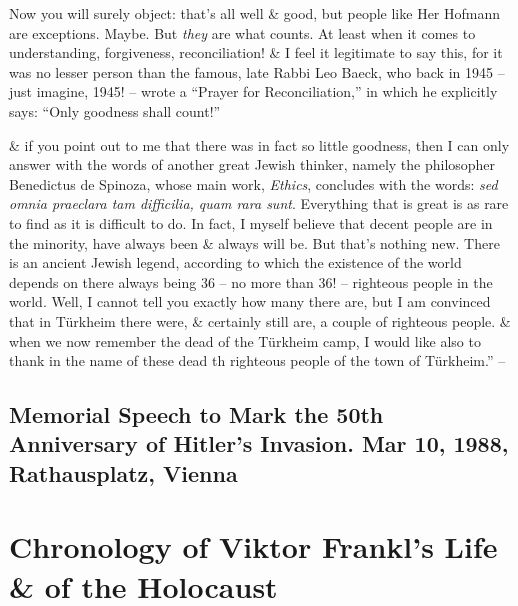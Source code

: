 \documentclass{article}
\numberwithin{equation}{section}
\begin{document}
Now you will surely object: that's all well \& good, but people like Her Hofmann are exceptions. Maybe. But \textit{they} are what counts. At least when it comes to understanding, forgiveness, reconciliation! \& I feel it legitimate to say this, for it was no lesser person than the famous, late Rabbi Leo Baeck, who back in 1945 -- just imagine, 1945! -- wrote a ``Prayer for Reconciliation,'' in which he explicitly says: ``Only goodness shall count!''

\& if you point out to me that there was in fact so little goodness, then I can only answer with the words of another great Jewish thinker, namely the philosopher Benedictus de Spinoza, whose main work, \textit{Ethics}, concludes with the words: \textit{sed omnia praeclara tam difficilia, quam rara sunt}. Everything that is great is as rare to find as it is difficult to do. In fact, I myself believe that decent people are in the minority, have always been \& always will be. But that's nothing new. There is an ancient Jewish legend, according to which the existence of the world depends on there always being 36 -- no more than 36! -- righteous people in the world. Well, I cannot tell you exactly how many there are, but I am convinced that in T\"urkheim there were, \& certainly still are, a couple of righteous people. \& when we now remember the dead of the T\"urkheim camp, I would like also to thank in the name of these dead th righteous people of the town of T\"urkheim.'' -- \cite[pp. 120--122]{Frankl2017}

\subsection{Memorial Speech to Mark the 50th Anniversary of Hitler's Invasion. Mar 10, 1988, Rathausplatz, Vienna}


\section{Chronology of Viktor Frankl's Life \& of the Holocaust}


\printbibliography[heading=bibintoc]
	
\end{document}
